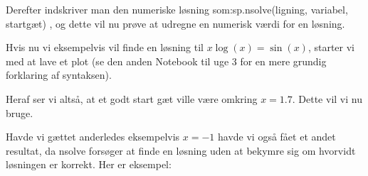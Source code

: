 \documentclass[letterpaper,10pt,english]{jupyterBook}
\begin{document}
Derefter indskriver man den numeriske løsning som:sp.nsolve(ligning, variabel, startgæt) , og dette vil nu prøve at udregne en numerisk værdi for en løsning.

Hvis nu vi eksempelvis vil finde en løsning til \(x\log(x) = \sin(x)\), starter vi med at lave et plot (se den anden Notebook til uge 3 for en mere grundig forklaring af syntaksen).

\begin{sphinxVerbatim}[commandchars=\\\{\}]
   
   

        
\end{sphinxVerbatim}

\noindent{}

Heraf ser vi altså, at et godt start gæt ville være omkring \(x=1.7\). Dette vil vi nu bruge.

\begin{sphinxVerbatim}[commandchars=\\\{\}]
     
  
\end{sphinxVerbatim}

\noindent{}

\noindent{}

Havde vi gættet anderledes eksempelvis \(x = - 1\) havde vi også fået et andet resultat, da nsolve forsøger at finde en løsning uden at bekymre sig om hvorvidt løsningen er korrekt. Her er eksempel:

\begin{sphinxVerbatim}[commandchars=\\\{\}]
   
\end{sphinxVerbatim}
\end{document}
